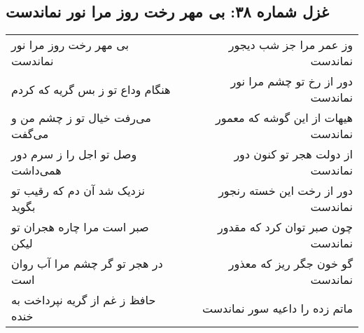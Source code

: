 \begin{center}
\section*{غزل شماره ۳۸: بی مهر رخت روز مرا نور نماندست}
\label{sec:sh038}
\begin{longtable}{l p{0.5cm} r}
بی مهر رخت روز مرا نور نماندست
&&
وز عمر مرا جز شب دیجور نماندست
\\
هنگام وداع تو ز بس گریه که کردم
&&
دور از رخ تو چشم مرا نور نماندست
\\
می‌رفت خیال تو ز چشم من و می‌گفت
&&
هیهات از این گوشه که معمور نماندست
\\
وصل تو اجل را ز سرم دور همی‌داشت
&&
از دولت هجر تو کنون دور نماندست
\\
نزدیک شد آن دم که رقیب تو بگوید
&&
دور از رخت این خسته رنجور نماندست
\\
صبر است مرا چاره هجران تو لیکن
&&
چون صبر توان کرد که مقدور نماندست
\\
در هجر تو گر چشم مرا آب روان است
&&
گو خون جگر ریز که معذور نماندست
\\
حافظ ز غم از گریه نپرداخت به خنده
&&
ماتم زده را داعیه سور نماندست
\\
\end{longtable}
\end{center}
